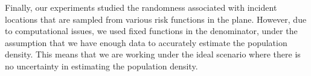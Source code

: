 Finally,
our experiments studied the randomness associated with incident locations that are sampled from various risk functions in the plane.
However,
due to computational issues,
we used fixed functions in the denominator,
under the assumption that we have enough data to accurately estimate the population density.
This means that we are working under the ideal scenario where there is no uncertainty in estimating the population density.



